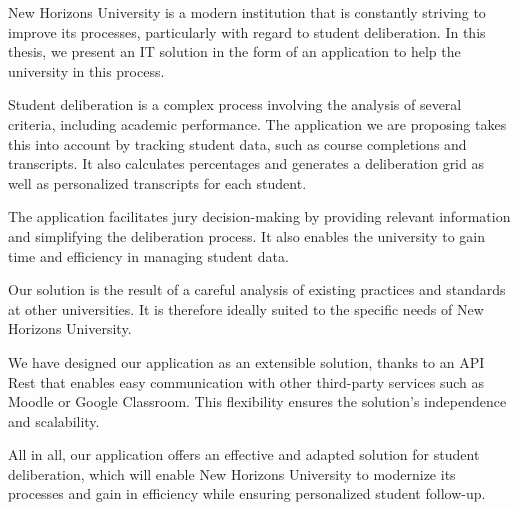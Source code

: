 New Horizons University is a modern institution that is constantly striving to improve its processes, particularly with regard to student deliberation. In this thesis, we present an IT solution in the form of an application to help the university in this process.

Student deliberation is a complex process involving the analysis of several criteria, including academic performance. The application we are proposing takes this into account by tracking student data, such as course completions and transcripts. It also calculates percentages and generates a deliberation grid as well as personalized transcripts for each student.

The application facilitates jury decision-making by providing relevant information and simplifying the deliberation process. It also enables the university to gain time and efficiency in managing student data.

Our solution is the result of a careful analysis of existing practices and standards at other universities. It is therefore ideally suited to the specific needs of New Horizons University.

We have designed our application as an extensible solution, thanks to an API Rest that enables easy communication with other third-party services such as Moodle or Google Classroom. This flexibility ensures the solution's independence and scalability.

All in all, our application offers an effective and adapted solution for student deliberation, which will enable New Horizons University to modernize its processes and gain in efficiency while ensuring personalized student follow-up.
